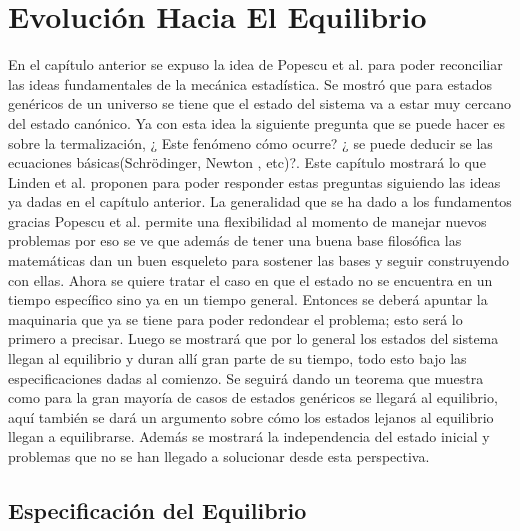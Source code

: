 \chapter{Evolución Hacia El Equilibrio}

En el capítulo anterior se expuso la idea de Popescu et al. \cite{Popescu2006} para poder reconciliar las ideas fundamentales de la mecánica estadística. Se mostró que para estados genéricos de un universo se tiene que el estado del sistema va a estar muy cercano del estado canónico. Ya con esta idea la siguiente pregunta que se puede hacer es sobre la termalización, ¿ Este fenómeno cómo ocurre? ¿ se puede deducir se las ecuaciones básicas(Schrödinger, Newton , etc)?. Este capítulo mostrará lo que Linden et al. \cite{LindenPaper} proponen para poder responder estas preguntas siguiendo las ideas ya dadas en el capítulo anterior. La generalidad que se ha dado a los fundamentos gracias Popescu et al. permite una flexibilidad al momento de manejar nuevos problemas por eso se ve que además de tener una buena base filosófica las matemáticas dan un buen esqueleto para sostener las bases y seguir construyendo con ellas. Ahora se quiere tratar el caso en que el estado no se encuentra en un tiempo específico sino ya en un tiempo  general. Entonces se deberá apuntar la maquinaria que ya se tiene para poder redondear el problema; esto será lo primero a  precisar. Luego se mostrará que por lo general los estados del sistema llegan al equilibrio y duran allí gran parte de su tiempo, todo esto bajo las especificaciones dadas al comienzo. Se seguirá dando un teorema que muestra como para la gran mayoría de casos de estados genéricos se llegará al equilibrio, aquí también se dará un argumento sobre cómo los estados lejanos al equilibrio  llegan a equilibrarse. Además se mostrará la independencia del estado inicial y problemas que no se han llegado a solucionar desde esta perspectiva.

\section{Especificación del Equilibrio}

